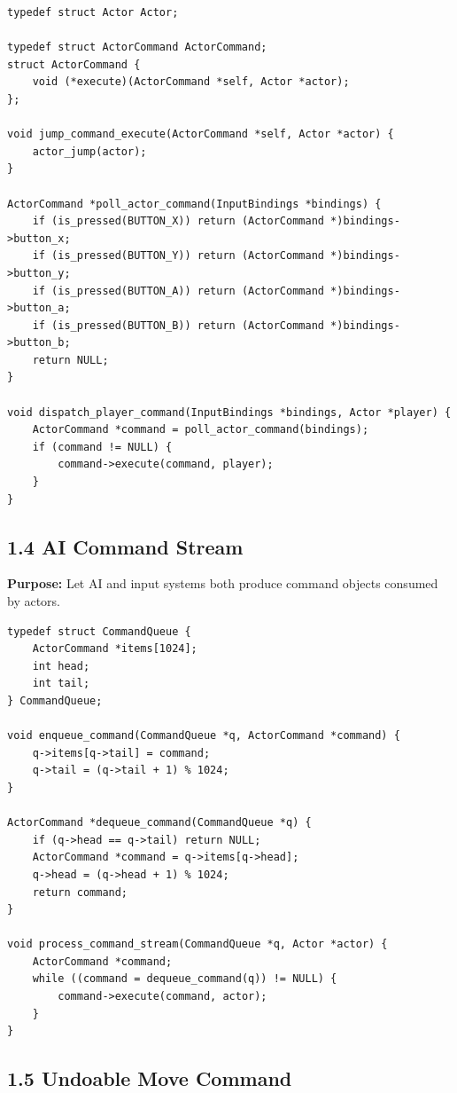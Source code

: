 \documentclass[10pt,letterpaper]{article}
\begin{document}
\begin{verbatim}
typedef struct Actor Actor;

typedef struct ActorCommand ActorCommand;
struct ActorCommand {
    void (*execute)(ActorCommand *self, Actor *actor);
};

void jump_command_execute(ActorCommand *self, Actor *actor) {
    actor_jump(actor);
}

ActorCommand *poll_actor_command(InputBindings *bindings) {
    if (is_pressed(BUTTON_X)) return (ActorCommand *)bindings->button_x;
    if (is_pressed(BUTTON_Y)) return (ActorCommand *)bindings->button_y;
    if (is_pressed(BUTTON_A)) return (ActorCommand *)bindings->button_a;
    if (is_pressed(BUTTON_B)) return (ActorCommand *)bindings->button_b;
    return NULL;
}

void dispatch_player_command(InputBindings *bindings, Actor *player) {
    ActorCommand *command = poll_actor_command(bindings);
    if (command != NULL) {
        command->execute(command, player);
    }
}
\end{verbatim}

\subsection{1.4 AI Command Stream}

\textbf{Purpose:} Let AI and input systems both produce command objects consumed by actors.

\begin{verbatim}
typedef struct CommandQueue {
    ActorCommand *items[1024];
    int head;
    int tail;
} CommandQueue;

void enqueue_command(CommandQueue *q, ActorCommand *command) {
    q->items[q->tail] = command;
    q->tail = (q->tail + 1) % 1024;
}

ActorCommand *dequeue_command(CommandQueue *q) {
    if (q->head == q->tail) return NULL;
    ActorCommand *command = q->items[q->head];
    q->head = (q->head + 1) % 1024;
    return command;
}

void process_command_stream(CommandQueue *q, Actor *actor) {
    ActorCommand *command;
    while ((command = dequeue_command(q)) != NULL) {
        command->execute(command, actor);
    }
}
\end{verbatim}

\subsection{1.5 Undoable Move Command}
\end{document}
